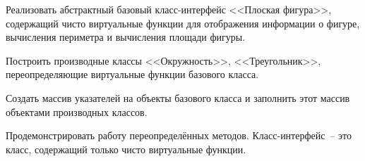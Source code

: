 Реализовать абстрактный базовый класс-интерфейс <<Плоская
фигура>>, содержащий чисто виртуальные функции для
отображения информации о фигуре, вычисления периметра и
вычисления площади фигуры.

Построить производные
классы <<Окружность>>, <<Треугольник>>, переопределяющие
виртуальные функции базового класса.

Создать массив
указателей на объекты базового класса и заполнить этот
массив объектами производных классов.

Продемонстрировать работу переопределённых методов.
Класс-интерфейс~-- это класс, содержащий только чисто
виртуальные функции.

